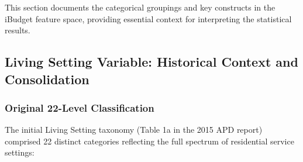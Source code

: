 This section documents the categorical groupings and key constructs in the iBudget feature space, providing essential context for interpreting the statistical results.

\subsection{Living Setting Variable: Historical Context and Consolidation}

\subsubsection{Original 22-Level Classification}

The initial Living Setting taxonomy (Table 1a in the 2015 APD report) comprised 22 distinct categories reflecting the full spectrum of residential service settings:

